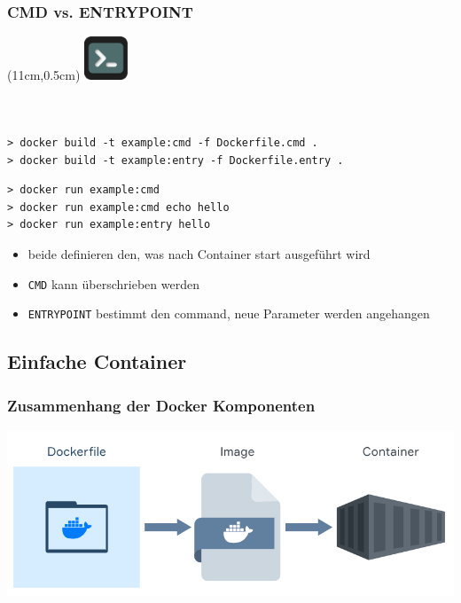 \documentclass[22pt]{beamer}
\newcommand{\code}[1]{\colorbox{gray!10}{\texttt{#1}}}
\newcommand{\terminal}{
    \begin{textblock*}{1.3cm}(11cm,0.5cm) %
    \includegraphics[width=1.3cm]{Bilder/terminal2.png}
    \end{textblock*}
}
\begin{document}
\begin{frame}[fragile, t]
    \frametitle{CMD vs. ENTRYPOINT}
    \terminal
    \begin{columns}[t]
        \begin{column}{0.5\textwidth}
            \inputminted[fontsize=\scriptsize, frame=lines]{dockerfile}{../examples/Dockerfile.cmd}
        \end{column}
        \begin{column}{0.5\textwidth}  %
            \inputminted[fontsize=\scriptsize, frame=lines]{dockerfile}{../examples/Dockerfile.entry}
        \end{column}
    \end{columns}
    \medskip
\begin{verbatim}
> docker build -t example:cmd -f Dockerfile.cmd .
> docker build -t example:entry -f Dockerfile.entry .
\end{verbatim} 
\pause
\begin{verbatim}
> docker run example:cmd
> docker run example:cmd echo hello
> docker run example:entry hello        
\end{verbatim}
    \pause \medskip
    \begin{itemize}
        \item beide definieren den, was nach Container start ausgeführt wird
        \item \code{CMD} kann überschrieben werden
        \item \code{ENTRYPOINT} bestimmt den command, neue Parameter werden angehangen
    \end{itemize}
\end{frame}



\subsection{Einfache Container}
\begin{frame}[c]
    \frametitle{Zusammenhang der Docker Komponenten}
    \includegraphics[width=1\textwidth]{Bilder/Docker-Ablauf_dark.png}
\end{frame}
\end{document}
